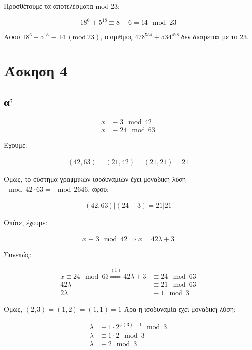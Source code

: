 \documentclass[11pt, oneside]{article}   	%
\begin{document}
 Προσθέτουμε τα αποτελέσματα mod 23:
 
 \[
 18^6 + 5^{18} \equiv 8 + 6 = 14 \mod 23
 \]
 
 Αφού \( 18^6 + 5^{18} \equiv 14 \ (\text{mod} \ 23) \), ο αριθμός \( 478^{534} + 534^{478} \) δεν διαιρείται με το 23.
 
 \section{Άσκηση 4}
 
 \subsection{α'}
 
 \begin{align*}
 	x &\equiv 3 \mod 42 \\
 	x &\equiv 24 \mod 63
 \end{align*}
 
 Έχουμε:
 
 \begin{align*}
 	(42,63) = (21, 42) = (21, 21) = 21 
 \end{align*}
 
 Όμως, το σύστημα γραμμικών ισοδυναμιών έχει μοναδική λύση $\mod 42 \cdot 63 = \mod 2646$, αφού:
 
 \begin{align*}
 	(42,63) | (24-3) = 21 | 21
 \end{align*}
 
 Οπότε, έχουμε:
 
 \begin{align}
 	x \equiv 3 \mod 42 \Rightarrow x=42\lambda + 3
 \end{align}
 
 Συνεπώς:
 
 \begin{align*}
 	x \equiv 24 \mod 63 \stackrel{(1)}{\Rightarrow} 42\lambda + 3 &\equiv 24 \mod 63 \\
 	42\lambda &\equiv 21 \mod 63 \\
 	2\lambda &\equiv 1 \mod 3
 \end{align*}
 
 Όμως, $(2,3) = (1,2) = (1,1) = 1$
 Άρα η ισοδυναμία έχει μοναδική λύση:
 
 \begin{align*}
 	\lambda &\equiv 1 \cdot 2^{\phi(3)-1} \mod 3 \\
 	\lambda &\equiv 1 \cdot 2 \mod 3 \\
 	\lambda &\equiv 2 \mod 3
 \end{align*}
 
\end{document}
